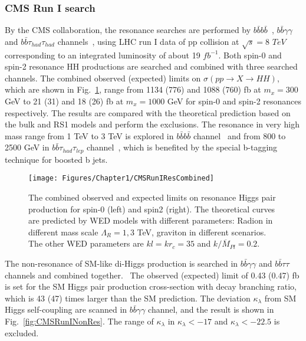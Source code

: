 \subsubsection{CMS Run I search}

By the CMS collaboration, the resonance searches are performed by $b\bar{b}b\bar{b}$~\cite{1503.04114}, $b\bar{b}\gamma\gamma$~\cite{1603.06896} and $b\bar{b}\tau_{had}\tau_{had}$ channels~\cite{1707.00350}, using LHC run I data of pp collision at $\sqrt{s}= 8$ $TeV$ corresponding to an integrated luminosity of about 19 $fb^{-1}$.
Both spin-0 and spin-2 resonance HH productions are searched and combined with three searched channels.
The combined observed (expected) limits on $\sigma(pp\rightarrow X \rightarrow HH)$, which are shown in Fig.~\ref{fig:CMSRunIResCombined}, range from 1134 (776) and 1088 (760) fb at $m_{x}=300$ GeV to 21 (31) and 18 (26) fb at $m_{x}=1000$ GeV for spin-0 and spin-2 resonances respectively.
The results are compared with the theoretical prediction based on the bulk and RS1 models and perform the exclusions.
The resonance in very high mass range from 1 TeV to 3 TeV is explored in $b\bar{b}b\bar{b}$ channel~\cite{1602.08762} and from 800 to 2500 GeV in $b\bar{b}\tau_{had}\tau_{lep}$ channel~\cite{CMS-PAS-EXO-15-008}, which is benefited by the special b-tagging technique for boosted b jets.~\cite{CMS-PAS-BTV-13-001}

\begin{figure}[h]
  \centering
  \texttt{[image: Figures/Chapter1/CMSRunIResCombined]}
  \caption{The combined observed and expected limits on resonance Higgs pair production for spin-0 (left) and spin2 (right).
  The theoretical curves are predicted by WED models with different parameters: Radion in different mass scale $\Lambda_{R}=1,3$ TeV, graviton in different scenarios. The other WED parameters are $kl=kr_{c}=35$ and $k/\overline{M}_{Pl}=0.2$.~\cite{1707.00350}}
  \label{fig:CMSRunIResCombined}
\end{figure}

The non-resonance of SM-like di-Higgs production is searched in $b\bar{b}\gamma\gamma$ and $b\bar{b}\tau\tau$ channels and combined together.~\cite{1707.00350}
The observed (expected) limit of 0.43 (0.47) fb is set for the SM Higgs pair production cross-section with decay branching ratio, which is 43 (47) times larger than the SM prediction.
The deviation $\kappa_{\lambda}$ from SM Higgs self-coupling are scanned in $b\bar{b}\gamma\gamma$ channel, and the result is shown in Fig.~\ref{fig:CMSRunINonRes}.
The range of $\kappa_{\lambda}$ in $\kappa_{\lambda}<-17$ and $\kappa_{\lambda}<-22.5$ is excluded.~\cite{1603.06896}

